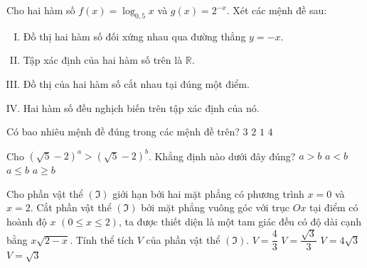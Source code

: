 \begin{ex}%
	Cho hai hàm số $f(x)=\log_{0,5}x$ và $g(x)=2^{-x}$. Xét các mệnh đề sau:
	\begin{enumerate}[(I)]
	\item  Đồ thị hai hàm số đối xứng nhau qua đường thẳng $y=-x$.
	\item Tập xác định của hai hàm số trên là $\mathbb{R}$.
\item Đồ thị của hai hàm số cắt nhau tại đúng một điểm.
\item  Hai hàm số đều nghịch biến trên tập xác định của nó.
\end{enumerate}
	Có bao nhiêu mệnh đề đúng trong các mệnh đề trên?
	\choice
	{$3$}
	{\True $2$}
	{$1$}
	{$4$}
\end{ex}

\begin{ex}%
	Cho $\left(\sqrt{5}-2\right)^a>\left(\sqrt{5}-2\right)^b$. Khẳng định nào dưới đây đúng?
	\choice
	{$a>b$}
	{\True $a<b$}
	{$a\le b$}
	{$a\ge b$}
\end{ex}

\begin{ex}%
	Cho phần vật thể $\left( \Im  \right)$ giới hạn bởi hai mặt phẳng có phương trình $x = 0$ và $x = 2$. Cắt phần vật thể $\left(\Im\right)$ bởi mặt phẳng vuông góc với trục $Ox$ tại điểm có hoành độ $x$ $\left({0 \leq x \leq 2} \right)$, ta được thiết diện là một tam giác đều có độ dài cạnh bằng $x\sqrt{2 - x} $. Tính thể tích $V$ của phần vật thể $\left( \Im  \right)$.
	\choice
	{$V = \dfrac{4}{3}$}
	{\True $V = \dfrac{\sqrt 3 }{3}$}
	{$V = 4\sqrt 3$}
	{$V = \sqrt 3$}
\end{ex}

